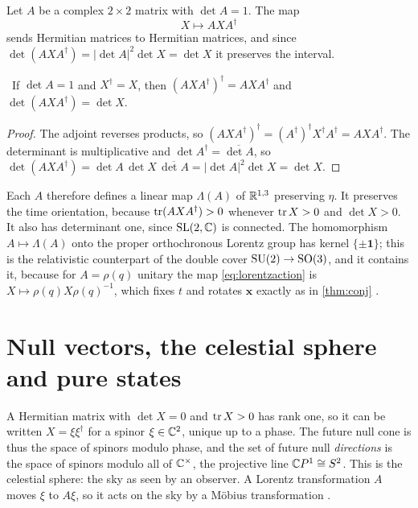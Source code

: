 Let $A$ be a complex $2\times2$ matrix with $\det A=1$. The map
\begin{equation}\label{eq:lorentzaction}
X\longmapsto AXA^\dagger
\end{equation}
sends Hermitian matrices to Hermitian matrices, and since $\det(AXA^\dagger)=|\det A|^2\det X=\det X$ it preserves the interval.

\begin{theorem}\label{thm:lorentzaction}\ver\
If $\det A=1$ and $X^\dagger=X$, then $(AXA^\dagger)^\dagger=AXA^\dagger$ and $\det(AXA^\dagger)=\det X$.
\end{theorem}
\begin{proof}
The adjoint reverses products, so $(AXA^\dagger)^\dagger=(A^\dagger)^\dagger X^\dagger A^\dagger=AXA^\dagger$. The determinant is multiplicative and $\det A^\dagger=\overline{\det A}$, so $\det(AXA^\dagger)=\det A\,\det X\,\overline{\det A}=|\det A|^2\det X=\det X$.
\end{proof}


Each $A$ therefore defines a linear map $\Lambda(A)$ of $\mathbb{R}^{1,3}$ preserving $\eta$. It preserves the time orientation, because $\operatorname{tr}(AXA^\dagger)>0$ whenever $\operatorname{tr} X>0$ and $\det X>0$. It also has determinant one, since $\mathrm{SL}(2,\mathbb{C})$ is connected. The homomorphism $A\mapsto\Lambda(A)$ onto the proper orthochronous Lorentz group has kernel $\{\pm\mathbf 1\}$; this is the relativistic counterpart of the double cover $\mathrm{SU}(2)\to\mathrm{SO}(3)$, and it contains it, because for $A=\rho(q)$ unitary the map \eqref{eq:lorentzaction} is $X\mapsto\rho(q)X\rho(q)^{-1}$, which fixes $t$ and rotates $\mathbf x$ exactly as in \cref{thm:conj} \cite{PenroseRindler1,Wigner1939}.

\section{Null vectors, the celestial sphere and pure states}

A Hermitian matrix with $\det X=0$ and $\operatorname{tr} X>0$ has rank one, so it can be written $X=\xi\xi^\dagger$ for a spinor $\xi\in\mathbb{C}^2$, unique up to a phase. The future null cone is thus the space of spinors modulo phase, and the set of future null \emph{directions} is the space of spinors modulo all of $\mathbb{C}^\times$, the projective line $\mathbb{C} P^1\cong S^2$. This is the celestial sphere: the sky as seen by an observer. A Lorentz transformation $A$ moves $\xi$ to $A\xi$, so it acts on the sky by a M\"obius transformation \cite{PenroseRindler1}.

